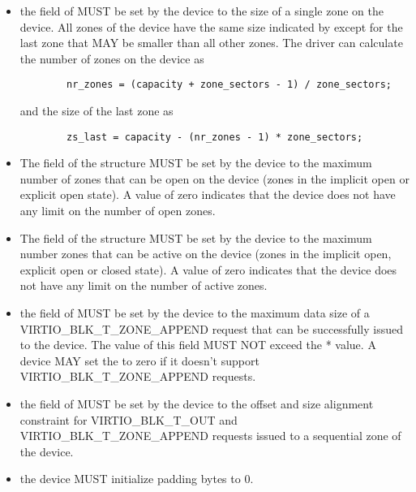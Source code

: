 \begin{itemize}
\item the  field of  MUST be set by the device
    to the size of a single zone on the device. All zones of the device have the
    same size indicated by  except for the last zone that
    MAY be smaller than all other zones. The driver can calculate the number of
    zones on the device as
    \begin{lstlisting}
        nr_zones = (capacity + zone_sectors - 1) / zone_sectors;
    \end{lstlisting}
    and the size of the last zone as
    \begin{lstlisting}
        zs_last = capacity - (nr_zones - 1) * zone_sectors;
    \end{lstlisting}

\item The  field of the  structure MUST be
    set by the device to the maximum number of zones that can be open on the
    device (zones in the implicit open or explicit open state). A value
    of zero indicates that the device does not have any limit on the number of
    open zones.

\item The  field of the  structure MUST
    be set by the device to the maximum number zones that can be active on the
    device (zones in the implicit open, explicit open or closed state). A value
    of zero indicates that the device does not have any limit on the number of
    active zones.

\item the  field of  MUST be set by
    the device to the maximum data size of a VIRTIO_BLK_T_ZONE_APPEND request
    that can be successfully issued to the device. The value of this field MUST
    NOT exceed the  *  value. A device MAY set
    the  to zero if it doesn't support
    VIRTIO_BLK_T_ZONE_APPEND requests.

\item the  field of  MUST be set by the
    device to the offset and size alignment constraint for VIRTIO_BLK_T_OUT
    and VIRTIO_BLK_T_ZONE_APPEND requests issued to a sequential zone of the
    device.

\item the device MUST initialize padding bytes  to 0.
\end{itemize}

